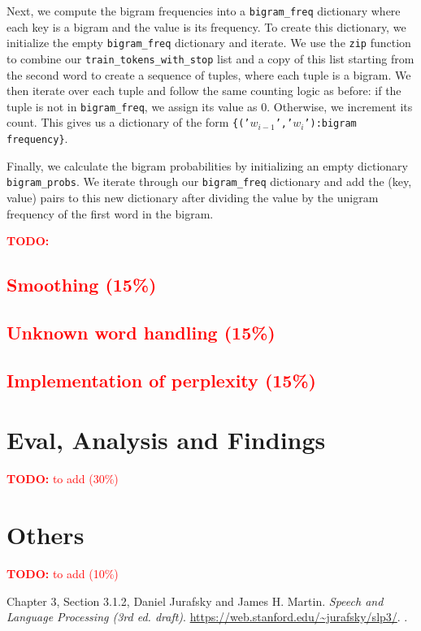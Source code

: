 \documentclass[a4paper]{article}
\newcommand{\todo}[1]{\textcolor{red}{\textbf{TODO:} #1}}
\begin{document}
Next, we compute the bigram frequencies into a \texttt{bigram\_freq} dictionary where each key is a bigram and the value is its frequency. To create this dictionary, we initialize the empty \texttt{bigram\_freq} dictionary and iterate. We use the \texttt{zip} function to combine our \texttt{train\_tokens\_with\_stop} list and a copy of this list starting from the second word to create a sequence of tuples, where each tuple is a bigram. We then iterate over each tuple and follow the same counting logic as before: if the tuple is not in \texttt{bigram\_freq}, we assign its value as 0. Otherwise, we increment its count. This gives us a dictionary of the form \texttt{\{('$w_{i-1}$','$w_i$'):bigram frequency\}}.

Finally, we calculate the bigram probabilities by initializing an empty dictionary \texttt{bigram\_probs}. We iterate through our \texttt{bigram\_freq} dictionary and add the (key, value) pairs to this new dictionary after dividing the value by the unigram frequency of the first word in the bigram.


\todo{
    \subsection{Smoothing (15\%)}
    \subsection{Unknown word handling (15\%)}
    \subsection{Implementation of perplexity (15\%)}
}


\section{Eval, Analysis and Findings}
\todo{to add (30\%)}


\section{Others}
\todo{to add (10\%)}

\newpage
\begin{thebibliography}{9}

Chapter 3, Section 3.1.2, Daniel Jurafsky and James H. Martin.
\newblock \textit{Speech and Language Processing (3rd ed. draft)}.
\newblock \url{https://web.stanford.edu/~jurafsky/slp3/}.
.

\end{thebibliography}
\end{document}
